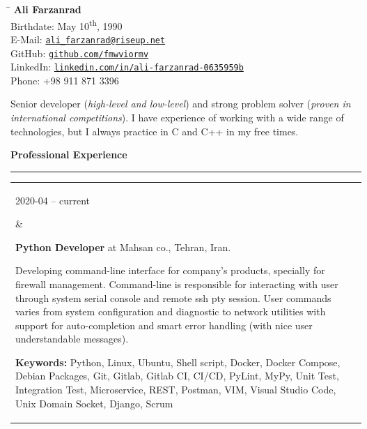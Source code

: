 \documentclass[11pt,a4paper,oneside]{article}
\makeatletter
\newcommand{\https}[1]{\href{https://#1}{\nolinkurl{#1}}}
\newcommand{\mailto}[1]{\href{mailto://#1}{\nolinkurl{#1}}}
\newcommand{\keywords}[1]{\textbf{Keywords:} #1}
\renewcommand{\section}[1]{%
{\large\textbf{#1}}\\
\rule[9pt]{18cm}{.4pt}\vspace{-16pt}%
}
\newenvironment{mytable}{%
\begin{tabular}{@{}l@{\hspace{4mm}}l@{}}%
}{\end{tabular}}
\newcommand{\myitem}[2]{%
\parbox[t]{16mm}{#1}&\parbox[t]{16cm}{#2}\\%
}
\makeatother
\begin{document}
%
%
\hspace{1cm}%
\parbox{13cm}{%
\begin{tabbing}%
\hspace{3cm}\=\kill%
\textbf{{\LARGE Ali Farzanrad}}\\[5mm]
Birthdate: \>
May 10\textsuperscript{th}, 1990\\[1mm]
E-Mail: \>
\mailto{ali_farzanrad@riseup.net}\\[1mm]
GitHub: \>
\https{github.com/fmwviormv}\\[1mm]
LinkedIn: \>
\https{linkedin.com/in/ali-farzanrad-0635959b}\\[1mm]
Phone: \>
+98{ }911{ }871{ }3396\\
\end{tabbing}%
}

\vspace{-9pt}%
Senior developer (\textit{high-level and low-level}) and strong
problem solver (\textit{proven in international competitions}).
I have experience of working with a wide range of technologies,
but I always practice in C and C++ in my free times.

\section{Professional Experience}

\begin{mytable}
\myitem{2020-04 -- current}{%
\textbf{Python Developer} at
Mahsan co., Tehran, Iran.

Developing command-line interface for company's products,
specially for firewall management.
Command-line is responsible for interacting with user through
system serial console and remote ssh pty session.
User commands varies from system configuration and diagnostic
to network utilities with support for auto-completion and
smart error handling (with nice user understandable messages).

\keywords{%
	Python, Linux, Ubuntu, Shell script, Docker, Docker Compose,
	Debian Packages, Git, Gitlab, Gitlab CI, CI/CD, PyLint, MyPy,
	Unit Test, Integration Test, Microservice, REST, Postman,
	VIM, Visual Studio Code, Unix Domain Socket, Django, Scrum
}
}
\end{mytable}
\end{document}
